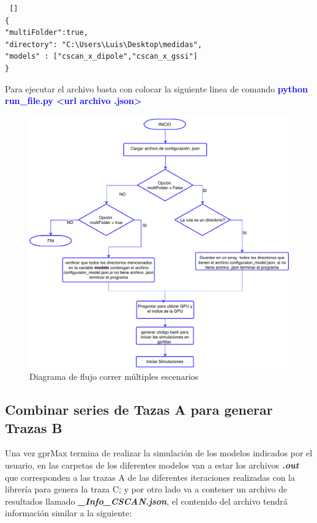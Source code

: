 \begin{lstlisting} []
{
"multiFolder":true,
"directory": "C:\Users\Luis\Desktop\medidas",
"models" : ["cscan_x_dipole","cscan_x_gssi"]
}
\end{lstlisting}

Para ejecutar el archivo basta con colocar la siguiente linea de comando \textcolor{blue}{\textbf{python run\_file.py <url archivo .json>}}


\begin{figure}[H]
\centering
\includegraphics[height=\textheight-3.5cm,keepaspectratio]{chapter1/images/diagrama_flujo_run_multiple.pdf}
\caption{Diagrama de flujo correr múltiples escenarios}
\label{fig:flow_config_file}
\end{figure}


\subsection{Combinar series de Tazas A para generar Trazas B}

Una vez gprMax termina de realizar la simulación de los modelos indicados por el usuario, en las carpetas de los diferentes modelos van a estar los archivos \textbf{\textit{.out}} que corresponden a las trazas A de las diferentes iteraciones realizadas con la librería para genera la traza C; y por otro lado va a contener un archivo de resultados llamado  \textbf{\textit{\_Info\_CSCAN.json}}, el contenido del archivo tendrá información similar a la siguiente:

